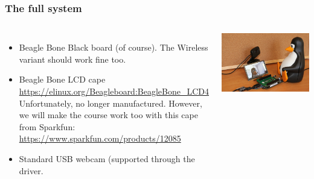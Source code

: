 \begin{frame}
  \frametitle{The full system}
  \begin{columns}
    \begin{itemize}
	\item Beagle Bone Black board (of course). The Wireless variant
	      should work fine too.
	\item Beagle Bone LCD cape\\
              \url{https://elinux.org/Beagleboard:BeagleBone_LCD4}\\
	      Unfortunately, no longer manufactured. However, we will
              make the course work too with this cape from Sparkfun:
              \url{https://www.sparkfun.com/products/12085}
        \item Standard USB webcam (supported through the 
	      driver.
    \end{itemize}
     \includegraphics[width=\textwidth]{common/beaglecam.jpg}
  \end{columns}
\end{frame}



